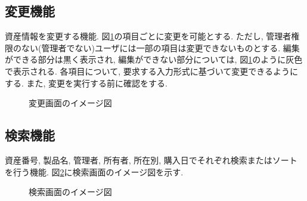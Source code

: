 \documentclass[11ptm]{jsarticle}
\begin{document}
\subsection{変更機能}
\label{subsec:変更機能}
資産情報を変更する機能. 図\ref{fig:変更画面のイメージ図}の項目ごとに変更を可能とする. ただし, 管理者権限のない(管理者でない)ユーザには一部の項目は変更できないものとする. 編集ができる部分は黒く表示され, 編集ができない部分については, 図\ref{fig:変更画面のイメージ図}のように灰色で表示される. 各項目について, 要求する入力形式に基づいて変更できるようにする. また, 変更を実行する前に確認をする.
\begin{figure}[h]
  \centering
  \caption{\label{fig:変更画面のイメージ図}変更画面のイメージ図}
\end{figure}

\clearpage
\subsection{検索機能}
\label{subsec:検索機能}
資産番号, 製品名, 管理者, 所有者, 所在別, 購入日でそれぞれ検索またはソートを行う機能. 図\ref{fig:検索画面のイメージ図}に検索画面のイメージ図を示す. 
\begin{figure}[h]
  \centering
  \caption{\label{fig:検索画面のイメージ図}検索画面のイメージ図}
\end{figure}
\end{document}
